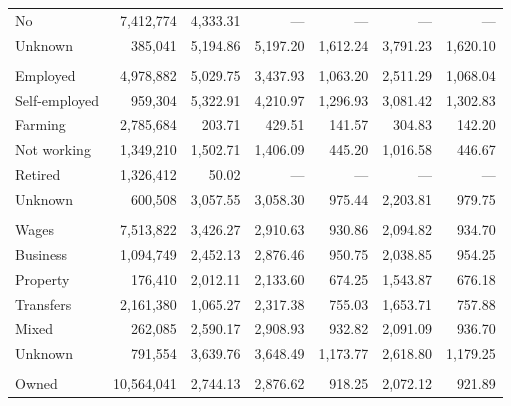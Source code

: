 \documentclass[10pt]{article}
\begin{document}
\begin{center}
\begin{minipage}{\textwidth}
\begin{tabularx}{\textwidth}{@{}Xrrrrrr@{}}
No & 7,412,774 & 4,333.31 & --- & --- & --- & --- \\

Unknown & 385,041 & 5,194.86 & 5,197.20 & 1,612.24 & 3,791.23 & 1,620.10 \\

\addlinespace[3pt]
\multicolumn{7}{l}{\textit{Employment status}} \\

Employed & 4,978,882 & 5,029.75 & 3,437.93 & 1,063.20 & 2,511.29 & 1,068.04 \\

Self-employed & 959,304 & 5,322.91 & 4,210.97 & 1,296.93 & 3,081.42 & 1,302.83 \\

Farming & 2,785,684 & 203.71 & 429.51 & 141.57 & 304.83 & 142.20 \\

Not working & 1,349,210 & 1,502.71 & 1,406.09 & 445.20 & 1,016.58 & 446.67 \\

Retired & 1,326,412 & 50.02 & --- & --- & --- & --- \\

Unknown & 600,508 & 3,057.55 & 3,058.30 & 975.44 & 2,203.81 & 979.75 \\

\addlinespace[3pt]
\multicolumn{7}{l}{\textit{Main income source}} \\

Wages & 7,513,822 & 3,426.27 & 2,910.63 & 930.86 & 2,094.82 & 934.70 \\

Business & 1,094,749 & 2,452.13 & 2,876.46 & 950.75 & 2,038.85 & 954.25 \\

Property & 176,410 & 2,012.11 & 2,133.60 & 674.25 & 1,543.87 & 676.18 \\

Transfers & 2,161,380 & 1,065.27 & 2,317.38 & 755.03 & 1,653.71 & 757.88 \\

Mixed & 262,085 & 2,590.17 & 2,908.93 & 932.82 & 2,091.09 & 936.70 \\

Unknown & 791,554 & 3,639.76 & 3,648.49 & 1,173.77 & 2,618.80 & 1,179.25 \\

\addlinespace[3pt]
\multicolumn{7}{l}{\textit{Housing tenure}} \\

Owned & 10,564,041 & 2,744.13 & 2,876.62 & 918.25 & 2,072.12 & 921.89 \\


\end{tabularx}
\end{minipage}
\end{center}
\end{document}
